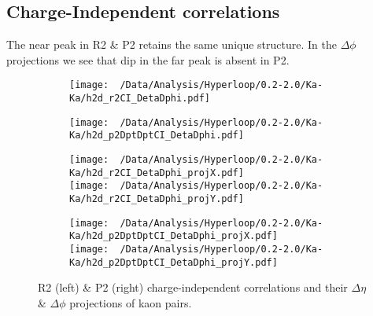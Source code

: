 \documentclass[12pt,a4paper,twoside]{report}
\begin{document}
\subsection{Charge-Independent correlations}
The near peak in R2 \& P2 retains the same unique structure. In the $\Delta\phi$ projections we see that dip in the far peak is absent in P2.
\begin{figure}[H]
	\begin{subfigure}{0.49\linewidth}
		\texttt{[image: ~/Data/Analysis/Hyperloop/0.2-2.0/Ka-Ka/h2d\_r2CI\_DetaDphi.pdf]}\\
	\end{subfigure}
	\begin{subfigure}{0.49\linewidth}
		\texttt{[image: ~/Data/Analysis/Hyperloop/0.2-2.0/Ka-Ka/h2d\_p2DptDptCI\_DetaDphi.pdf]}\\
	\end{subfigure}
\end{figure}
\begin{figure}[H]
	\ContinuedFloat
	\begin{subfigure}{0.49\linewidth}
		\texttt{[image: ~/Data/Analysis/Hyperloop/0.2-2.0/Ka-Ka/h2d\_r2CI\_DetaDphi\_projX.pdf]}\\
		\texttt{[image: ~/Data/Analysis/Hyperloop/0.2-2.0/Ka-Ka/h2d\_r2CI\_DetaDphi\_projY.pdf]}\\
	\end{subfigure}
	\begin{subfigure}{0.49\linewidth}
		\texttt{[image: ~/Data/Analysis/Hyperloop/0.2-2.0/Ka-Ka/h2d\_p2DptDptCI\_DetaDphi\_projX.pdf]}\\
		\texttt{[image: ~/Data/Analysis/Hyperloop/0.2-2.0/Ka-Ka/h2d\_p2DptDptCI\_DetaDphi\_projY.pdf]}\\
	\end{subfigure}
	\caption{R2 (left) \& P2 (right) charge-independent correlations and their $\Delta\eta$ \& $\Delta\phi$ projections of kaon pairs.}
\end{figure}
\end{document}
